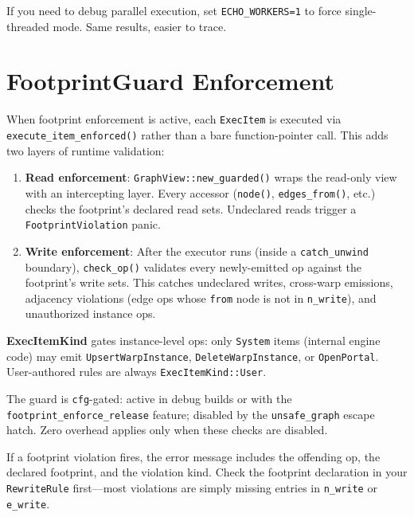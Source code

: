 \begin{protip}
If you need to debug parallel execution, set \texttt{ECHO\_WORKERS=1} to force single-threaded mode. Same results, easier to trace.
\end{protip}

\section{FootprintGuard Enforcement}

When footprint enforcement is active, each \texttt{ExecItem} is executed via
\texttt{execute\_item\_enforced()} rather than a bare function-pointer call.
This adds two layers of runtime validation:

\begin{enumerate}
    \item \textbf{Read enforcement}: \texttt{GraphView::new\_guarded()} wraps
    the read-only view with an intercepting layer. Every accessor
    (\texttt{node()}, \texttt{edges\_from()}, etc.) checks the footprint's
    declared read sets. Undeclared reads trigger a
    \texttt{FootprintViolation} panic.

    \item \textbf{Write enforcement}: After the executor runs (inside a
    \texttt{catch\_unwind} boundary), \texttt{check\_op()} validates every
    newly-emitted op against the footprint's write sets. This catches
    undeclared writes, cross-warp emissions, adjacency violations (edge ops
    whose \texttt{from} node is not in \texttt{n\_write}), and unauthorized
    instance ops.
\end{enumerate}

\textbf{ExecItemKind} gates instance-level ops: only \texttt{System} items
(internal engine code) may emit \texttt{UpsertWarpInstance},
\texttt{DeleteWarpInstance}, or \texttt{OpenPortal}. User-authored rules
are always \texttt{ExecItemKind::User}.

The guard is \texttt{cfg}-gated: active in debug builds or with the
\texttt{footprint\_enforce\_release} feature; disabled by the
\texttt{unsafe\_graph} escape hatch. Zero overhead applies only when these
checks are disabled.

\begin{protip}
If a footprint violation fires, the error message includes the offending op, the declared footprint, and the violation kind. Check the footprint declaration in your \texttt{RewriteRule} first---most violations are simply missing entries in \texttt{n\_write} or \texttt{e\_write}.
\end{protip}

